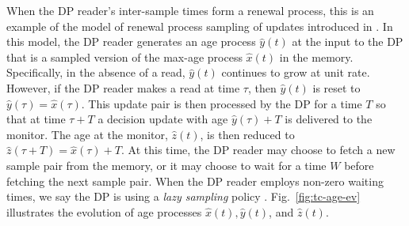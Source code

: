 \documentclass[conference, 10pt]{IEEEtran}
\newcommand{\maxage}{\hat{x}}
\newcommand{\dpage}{\hat{y}}
\newcommand{\monage}{\hat{z}}
\begin{document}
When the DP reader's inter-sample times form a renewal process, this is an example of the model of renewal process sampling of updates introduced in \cite{Yates-IT2020}.  In this model, the DP reader generates  an age process $\dpage(t)$  at the input to the DP that is a sampled version of the max-age process $\maxage(t)$ in the memory. Specifically, in the absence of a read, $\dpage(t)$ continues to grow at unit rate. However, if the DP reader makes a read at time $\tau$, then $\dpage(t)$ is reset to $\dpage(\tau)=\maxage(\tau)$. This update pair is then processed by the DP  for a time $T$ so that at time $\tau+T$ a decision update with age $\dpage(\tau)+T$ is delivered to the monitor. The age at the monitor, $\monage(t)$,  is  then reduced to $\monage(\tau+T)=\maxage(\tau)+T$. At this time, the DP reader may choose to fetch a new sample pair from the memory, or it may choose to wait for a time $W$ before fetching the next sample pair. When the DP reader employs non-zero waiting times, we say the DP is using a {\em lazy sampling} policy \cite{Yates-isit2015}. 
Fig.~\ref{fig:tc-age-ev} illustrates the evolution of age processes $\maxage(t), \dpage(t)$, and $\monage(t)$.
\end{document}

